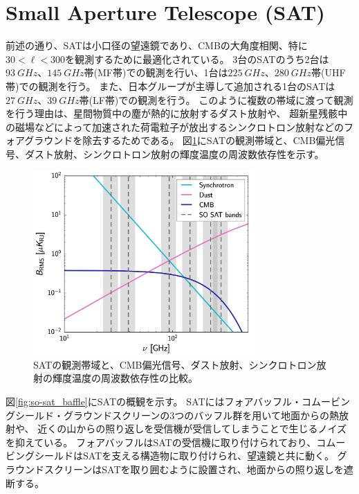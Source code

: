 \documentclass[../../main.tex]{subfiles}
\begin{document}
\section{Small Aperture Telescope (SAT)}
前述の通り、SATは小口径の望遠鏡であり、CMBの大角度相関、特に$30<\ell<300$を観測するために最適化されている。
3台のSATのうち2台は$\SI{93}{GHz}$、$\SI{145}{GHz}$帯(MF帯)での観測を行い、1台は$\SI{225}{GHz}$、$\SI{280}{GHz}$帯(UHF帯)での観測を行う。
また、日本グループが主導して追加される1台のSATは$\SI{27}{GHz}$、$\SI{39}{GHz}$帯(LF帯)での観測を行う。
このように複数の帯域に渡って観測を行う理由は、星間物質中の塵が熱的に放射するダスト放射や、
超新星残骸中の磁場などによって加速された荷電粒子が放出するシンクロトロン放射などのフォアグラウンドを除去するためである。
図\ref{fig:so_noise_freq}にSATの観測帯域と、CMB偏光信号、ダスト放射、シンクロトロン放射の輝度温度の周波数依存性を示す。
\begin{figure}[H]
    \centering
    \includegraphics[width=0.75\textwidth]{simons_observatory/so_noise_freq.pdf}
    \caption{SATの観測帯域と、CMB偏光信号、ダスト放射、シンクロトロン放射の輝度温度の周波数依存性の比較。}
    \label{fig:so_noise_freq}
\end{figure}

図\ref{fig:so-sat_baffle}にSATの概観を示す。
SATにはフォアバッフル・コムービングシールド・グラウンドスクリーンの3つのバッフル群を用いて地面からの熱放射や、
近くの山からの照り返しを受信機が受信してしまうことで生じるノイズを抑えている\cite{Kiuchi_2020}。
フォアバッフルはSATの受信機に取り付けられており、コムービングシールドはSATを支える構造物に取り付けられ、望遠鏡と共に動く。
グラウンドスクリーンはSATを取り囲むように設置され、地面からの照り返しを遮断する。
\end{document}
